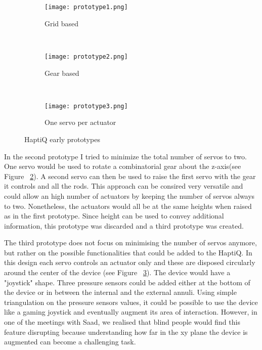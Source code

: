 \begin{figure}
        \centering
        \begin{subfigure}[H]{0.5\textwidth}
                \texttt{[image: prototype1.png]}
                \caption{Grid based}
                \label{fig:first prototype}
        \end{subfigure}%
        ~ %
        \begin{subfigure}[H]{0.5\textwidth}
                \texttt{[image: prototype2.png]}
                \caption{Gear based}
                \label{fig:second prototype}
        \end{subfigure}
        ~ %
        \begin{subfigure}[H]{0.5\textwidth}
                \texttt{[image: prototype3.png]}
                \caption{One servo per actuator}
                \label{fig:third prototype}
        \end{subfigure}
        \caption{HaptiQ early prototypes}\label{fig:HaptiQ-early-prototypes}
\end{figure}

In the second prototype I tried to minimize the total number of servos to two. One servo would be used to rotate a combinatorial gear about the z-axis(see Figure ~\ref{fig:second prototype}). A second servo can then be used to raise the first servo with the gear it controls and all the rods. This approach can be consired very versatile and could allow an high number of actuators by keeping the number of servos always to two. Nonetheless, the actuators would all be at the same heights when raised as in the first prototype. Since height can be used to convey additional information, this prototype was discarded and a third prototype was created.

The third prototype does not focus on minimising the number of servos anymore, but rather on the possible functionalities that could be added to the HaptiQ. In this design each servo controls an actuator only and these are disposed circularly around the center of the device (see Figure ~\ref{fig:third prototype}). The device would have a "joystick" shape. Three pressure sensors could be added either at the bottom of the device or in between the internal and the external annuli. Using simple triangulation on the pressure sensors values, it could be possible to use the device like a gaming joystick and eventually augment its area of interaction. However, in one of the meetings with Saad, we realised that blind people would find this feature disrupting because understanding how far in the xy plane the device is augmented can become a challenging task. 

